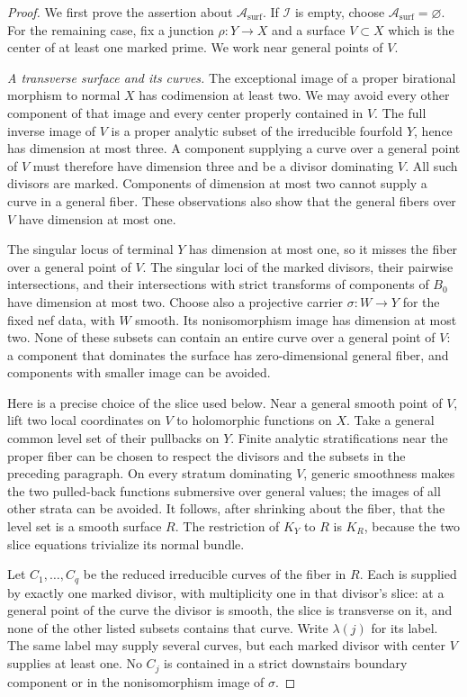 \begin{proof}
We first prove the assertion about $\mathcal A_{\mathrm{surf}}$.  If
$\mathcal I$ is empty, choose $\mathcal A_{\mathrm{surf}}=\varnothing$.
For the remaining case, fix a junction $\rho:Y\to X$ and a surface
$V\subset X$ which is the center of at least one marked prime.  We work
near general points of $V$.

\medskip\noindent\emph{A transverse surface and its curves.}
The exceptional image of a proper birational morphism to normal $X$ has
codimension at least two.  We may avoid every other component of that
image and every center properly contained in $V$.  The full inverse image
of $V$ is a proper analytic subset of the irreducible fourfold $Y$, hence
has dimension at most three.  A component supplying a curve over a general
point of $V$ must therefore have dimension three and be a divisor
dominating $V$.  All such divisors are marked.  Components of dimension
at most two cannot supply a curve in a general fiber.  These observations
also show that the general fibers over $V$ have dimension at most one.

The singular locus of terminal $Y$ has dimension at most one, so it misses
the fiber over a general point of $V$.  The singular loci of the marked
divisors, their pairwise intersections, and their intersections with
strict transforms of components of $B_0$ have dimension at most two.
Choose also a projective carrier $\sigma:W\to Y$ for the fixed nef data,
with $W$ smooth.  Its nonisomorphism image has dimension at most two.  None of
these subsets can contain an entire curve over a general point of $V$:
a component that dominates the surface has zero-dimensional general
fiber, and components with smaller image can be avoided.

Here is a precise choice of the slice used below.  Near a general smooth
point of $V$, lift two local coordinates on $V$ to holomorphic functions
on $X$.  Take a general common level set of their pullbacks on $Y$.
Finite analytic stratifications near the proper fiber can be chosen to
respect the divisors and the subsets in the preceding paragraph.  On
every stratum dominating $V$, generic smoothness makes the two pulled-back
functions submersive over general values; the images of all other strata
can be avoided.  It follows, after shrinking about the fiber, that the
level set is a smooth surface $R$.  The restriction of $K_Y$ to $R$ is
$K_R$, because the two slice equations trivialize its normal bundle.

Let $C_1,\ldots,C_q$ be the reduced irreducible curves of the fiber in
$R$.  Each is supplied by exactly one marked divisor, with multiplicity
one in that divisor's slice: at a general point of the curve the divisor
is smooth, the slice is transverse on it, and none of the other listed
subsets contains that curve.  Write $\lambda(j)$ for its label.  The same
label may supply several curves, but each marked divisor with center $V$
supplies at least one.  No $C_j$ is contained in a strict downstairs
boundary component or in the nonisomorphism image of $\sigma$.


\end{proof}
